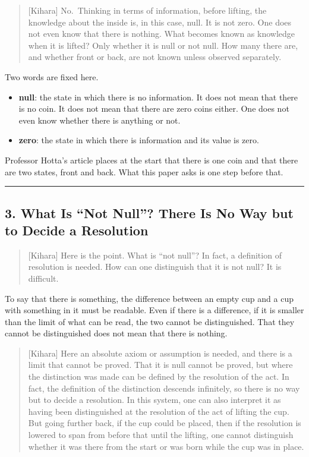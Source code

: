 \documentclass[
  a4paper,
]{article}
\providecommand{\tightlist}{%
  \setlength{\itemsep}{0pt}\setlength{\parskip}{0pt}}
\begin{document}
\begin{quote}
{[}Kihara{]} No.~Thinking in terms of information, before lifting, the
knowledge about the inside is, in this case, null. It is not zero. One
does not even know that there is nothing. What becomes known as
knowledge when it is lifted? Only whether it is null or not null. How
many there are, and whether front or back, are not known unless observed
separately.
\end{quote}

Two words are fixed here.

\begin{itemize}
\tightlist
\item
  \textbf{null}: the state in which there is no information. It does not
  mean that there is no coin. It does not mean that there are zero coins
  either. One does not even know whether there is anything or not.
\item
  \textbf{zero}: the state in which there is information and its value
  is zero.
\end{itemize}

Professor Hotta's article places at the start that there is one coin and
that there are two states, front and back. What this paper asks is one
step before that.

\begin{center}\rule{0.5\linewidth}{0.5pt}\end{center}

\subsection{3. What Is ``Not Null''? There Is No Way but to Decide a
Resolution}\label{what-is-not-null-there-is-no-way-but-to-decide-a-resolution}

\begin{quote}
{[}Kihara{]} Here is the point. What is ``not null''? In fact, a
definition of resolution is needed. How can one distinguish that it is
not null? It is difficult.
\end{quote}

To say that there is something, the difference between an empty cup and
a cup with something in it must be readable. Even if there is a
difference, if it is smaller than the limit of what can be read, the two
cannot be distinguished. That they cannot be distinguished does not mean
that there is nothing.

\begin{quote}
{[}Kihara{]} Here an absolute axiom or assumption is needed, and there
is a limit that cannot be proved. That it is null cannot be proved, but
where the distinction was made can be defined by the resolution of the
act. In fact, the definition of the distinction descends infinitely, so
there is no way but to decide a resolution. In this system, one can also
interpret it as having been distinguished at the resolution of the act
of lifting the cup. But going further back, if the cup could be placed,
then if the resolution is lowered to span from before that until the
lifting, one cannot distinguish whether it was there from the start or
was born while the cup was in place.
\end{quote}
\end{document}
